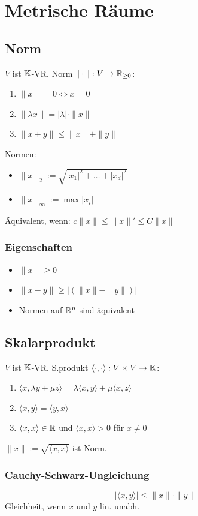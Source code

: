 \section*{Metrische Räume}

\subsection*{Norm}
$V$ ist $\mathbb{K}$-VR. Norm $\|\cdot\|: V\to\mathbb{R}_{\ge 0}$:
\begin{enumerate}
	\item $\|x\| = 0 \iff x = 0$
	\item $\|\lambda x\| = |\lambda| \cdot \|x\|$
	\item $\|x+y\| \le \|x\| + \|y\|$
\end{enumerate}
Normen:
\begin{itemize}
	\item $\|x\|_2 := \sqrt{|x_1|^2 + \ldots + |x_d|^2}$
	\item $\|x\|_\infty := \max|x_i|$
\end{itemize}
Äquivalent, wenn: $c\|x\| \le \|x\|' \le C\|x\|$

\subsubsection*{Eigenschaften}
\begin{itemize}
	\item $\|x\| \ge 0$
	\item $\|x-y\| \ge |(\|x\| - \|y\|)|$
	\item Normen auf $\mathbb{R}^n$ sind äquivalent
\end{itemize}

\subsection*{Skalarprodukt}
$V$ ist $\mathbb{K}$-VR. S.produkt $\langle\cdot,\cdot\rangle : V\times V \to \mathbb{K}$:
\begin{enumerate}
	\item $\langle x, \lambda y + \mu z\rangle = \lambda \langle x,y\rangle + \mu \langle x, z\rangle$
	\item $\langle x,y\rangle = \overline{\langle y,x \rangle}$
	\item $\langle x,x \rangle\in\mathbb{R}$ und $\langle x,x \rangle > 0$ für $x \neq 0$
\end{enumerate}
$\|x\| := \sqrt{\langle x, x \rangle}$ ist Norm.

\subsubsection*{Cauchy-Schwarz-Ungleichung}
\[|\langle x,y \rangle| \le \|x\| \cdot \|y\|\]
Gleichheit, wenn $x$ und $y$ lin. unabh.

